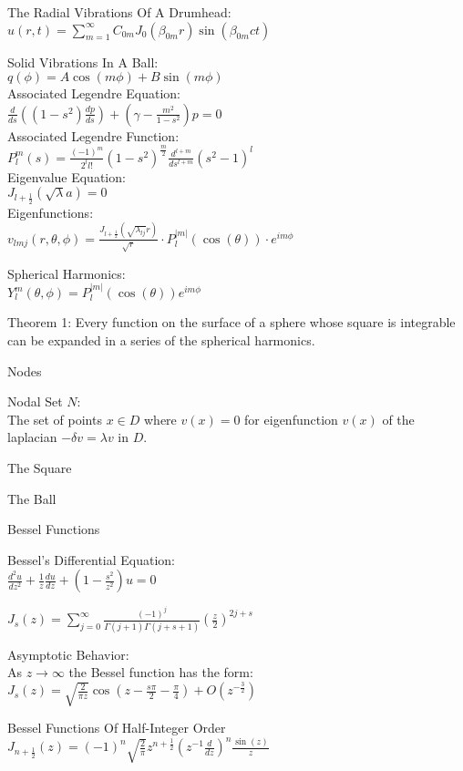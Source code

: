 The Radial Vibrations Of A Drumhead: \\
$u(r,t)=\sum_{m=1}^{\infty} C_{0m} J_0 (\beta_{0m}r) \sin (\beta_{0m} ct)$

Solid Vibrations In A Ball: \\
$q(\phi)=A \cos(m \phi) + B \sin(m \phi)$ \\
Associated Legendre Equation: \\
$\frac{d}{ds} \left((1-s^2)\frac{dp}{ds} \right) + \left(\gamma - \frac{m^2}{1-s^2} \right)p=0$ \\
Associated Legendre Function: \\
$P_l^m (s)=\frac{(-1)^m}{2^l l!} (1-s^2)^{\frac{m}{2}} \frac{d^{l+m}}{ds^{l+m}} (s^2-1)^l$ \\
Eigenvalue Equation: \\
$J_{l+\frac{1}{2}} (\sqrt{\lambda} a)=0$ \\
Eigenfunctions: \\
$v_{lmj} (r,\theta,\phi) = \frac{J_{l+\frac{1}{2}} (\sqrt{\lambda_{lj}} r)}{\sqrt{r}} \cdot P_l^{|m|} (\cos (\theta)) \cdot e^{i m \phi}$

Spherical Harmonics: \\
$Y_l^m (\theta,\phi)=P_l^{|m|} (\cos (\theta)) e^{i m \phi}$

Theorem 1: Every function on the surface of a sphere whose square is integrable can be expanded in a series of the spherical harmonics.

Nodes

Nodal Set $N$: \\
The set of points $x \in D$ where $v(x)=0$ for eigenfunction $v(x)$ of the laplacian $- \delta v = \lambda v$ in $D$.

The Square

The Ball

Bessel Functions

Bessel's Differential Equation: \\
$\frac{d^2 u}{dz^2}+\frac{1}{z} \frac{du}{dz}+ \left(1-\frac{s^2}{z^2} \right)u=0$

$J_s (z)=\sum_{j=0}^{\infty} \frac{(-1)^j}{\Gamma (j+1) \Gamma (j+s+1)} \left(\frac{z}{2} \right)^{2j+s}$

Asymptotic Behavior: \\
As $z \to \infty$ the Bessel function has the form: \\
$J_s (z) = \sqrt{\frac{2}{\pi z}} \cos \left(z-\frac{s \pi}{2}-\frac{\pi}{4} \right) + O(z^{-\frac{3}{2}})$

Bessel Functions Of Half-Integer Order \\
$J_{n+\frac{1}{2}} (z)=(-1)^n \sqrt{\frac{2}{\pi}} z^{n+\frac{1}{2}} \left(z^{-1} \frac{d}{dz} \right)^n \frac{\sin (z)}{z}$

